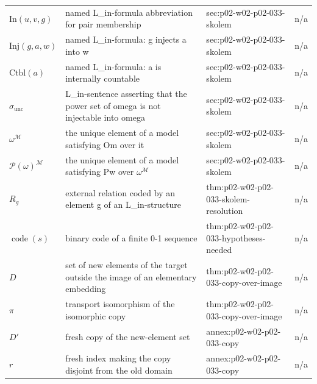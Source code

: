 \begin{longtable}{@{}p{}p{}p{}p{}@{}}
\(\mathrm{In}(u,\allowbreak v,\allowbreak g)\) & named L\_in-formula abbreviation for pair membership & sec:\allowbreak{}p02-\allowbreak{}w02-\allowbreak{}p02-\allowbreak{}033-\allowbreak{}skolem & n/a \\
\(\mathrm{Inj}(g,\allowbreak a,\allowbreak w)\) & named L\_in-formula: g injects a into w & sec:\allowbreak{}p02-\allowbreak{}w02-\allowbreak{}p02-\allowbreak{}033-\allowbreak{}skolem & n/a \\
\(\mathrm{Ctbl}(a)\) & named L\_in-formula: a is internally countable & sec:\allowbreak{}p02-\allowbreak{}w02-\allowbreak{}p02-\allowbreak{}033-\allowbreak{}skolem & n/a \\
\(\sigma_{\mathrm{unc}}\) & L\_in-sentence asserting that the power set of omega is not injectable into omega & sec:\allowbreak{}p02-\allowbreak{}w02-\allowbreak{}p02-\allowbreak{}033-\allowbreak{}skolem & n/a \\
\(\omega^{\mathcal M}\) & the unique element of a model satisfying Om over it & sec:\allowbreak{}p02-\allowbreak{}w02-\allowbreak{}p02-\allowbreak{}033-\allowbreak{}skolem & n/a \\
\(\mathcal P(\omega)^{\mathcal M}\) & the unique element of a model satisfying Pw over \(\omega^{\mathcal M}\) & sec:\allowbreak{}p02-\allowbreak{}w02-\allowbreak{}p02-\allowbreak{}033-\allowbreak{}skolem & n/a \\
\(R_g\) & external relation coded by an element g of an L\_in-structure & thm:\allowbreak{}p02-\allowbreak{}w02-\allowbreak{}p02-\allowbreak{}033-\allowbreak{}skolem-\allowbreak{}resolution & n/a \\
\(\operatorname{code}(s)\) & binary code of a finite 0-1 sequence & thm:\allowbreak{}p02-\allowbreak{}w02-\allowbreak{}p02-\allowbreak{}033-\allowbreak{}hypotheses-\allowbreak{}needed & n/a \\
\(D\) & set of new elements of the target outside the image of an elementary embedding & thm:\allowbreak{}p02-\allowbreak{}w02-\allowbreak{}p02-\allowbreak{}033-\allowbreak{}copy-\allowbreak{}over-\allowbreak{}image & n/a \\
\(\pi\) & transport isomorphism of the isomorphic copy & thm:\allowbreak{}p02-\allowbreak{}w02-\allowbreak{}p02-\allowbreak{}033-\allowbreak{}copy-\allowbreak{}over-\allowbreak{}image & n/a \\
\(D'\) & fresh copy of the new-element set & annex:\allowbreak{}p02-\allowbreak{}w02-\allowbreak{}p02-\allowbreak{}033-\allowbreak{}copy & n/a \\
\(r\) & fresh index making the copy disjoint from the old domain & annex:\allowbreak{}p02-\allowbreak{}w02-\allowbreak{}p02-\allowbreak{}033-\allowbreak{}copy & n/a \\

\end{longtable}
